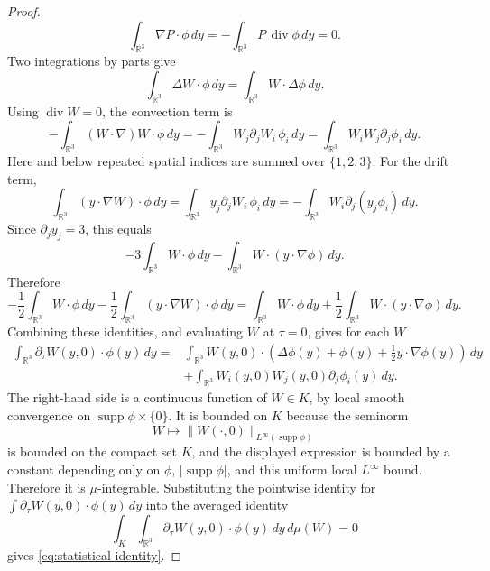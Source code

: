 \documentclass[11pt]{amsart}
\theoremstyle{plain}
\theoremstyle{definition}
\theoremstyle{remark}
\numberwithin{equation}{section}
\begin{document}
\begin{proof}
\[
   \int_{\mathbb R^3}\nabla P\cdot\phi\,dy
   =
   -\int_{\mathbb R^3}P\,\operatorname{div}\phi\,dy=0 .
\]
Two integrations by parts give
\[
   \int_{\mathbb R^3}\Delta W\cdot\phi\,dy
   =
   \int_{\mathbb R^3}W\cdot\Delta\phi\,dy .
\]
Using \(\operatorname{div}W=0\), the convection term is
\[
   -\int_{\mathbb R^3}(W\cdot\nabla)W\cdot\phi\,dy
   =
   -\int_{\mathbb R^3}W_j\partial_jW_i\,\phi_i\,dy
   =
   \int_{\mathbb R^3}W_iW_j\partial_j\phi_i\,dy .
\]
Here and below repeated spatial indices are summed over \(\{1,2,3\}\).
For the drift term,
\[
   \int_{\mathbb R^3}(y\cdot\nabla W)\cdot\phi\,dy
   =
   \int_{\mathbb R^3}y_j\partial_jW_i\,\phi_i\,dy
   =
   -\int_{\mathbb R^3}W_i\partial_j(y_j\phi_i)\,dy .
\]
Since \(\partial_jy_j=3\), this equals
\[
   -3\int_{\mathbb R^3}W\cdot\phi\,dy
   -
   \int_{\mathbb R^3}W\cdot(y\cdot\nabla\phi)\,dy .
\]
Therefore
\[
   -\frac12\int_{\mathbb R^3} W\cdot\phi\,dy
   -
   \frac12\int_{\mathbb R^3} (y\cdot\nabla W)\cdot\phi\,dy
   =
   \int_{\mathbb R^3} W\cdot\phi\,dy
   +
   \frac12\int_{\mathbb R^3} W\cdot(y\cdot\nabla\phi)\,dy .
\]
Combining these identities, and evaluating \(W\) at \(\tau=0\), gives for
each \(W\)
\[
   \begin{aligned}
   \int_{\mathbb R^3}\partial_\tau W(y,0)\cdot\phi(y)\,dy
   =
   &\int_{\mathbb R^3}
   W(y,0)\cdot
   \left(\Delta\phi(y)+\phi(y)+\frac12 y\cdot\nabla\phi(y)\right)\,dy\\
   &+
   \int_{\mathbb R^3}
   W_i(y,0)W_j(y,0)\partial_j\phi_i(y)\,dy .
   \end{aligned}
\]
The right-hand side is a continuous function of \(W\in K\), by local smooth
convergence on \(\operatorname{supp}\phi\times\{0\}\).  It is bounded on
\(K\) because the seminorm
\[
   W\mapsto \|W(\cdot,0)\|_{L^\infty(\operatorname{supp}\phi)}
\]
is bounded on the compact set \(K\), and the displayed expression is bounded
by a constant depending only on \(\phi\), \(|\operatorname{supp}\phi|\), and
this uniform local \(L^\infty\) bound.  Therefore it is \(\mu\)-integrable.
Substituting the pointwise identity for
\(\int \partial_\tau W(y,0)\cdot\phi(y)\,dy\) into the averaged identity
\[
   \int_K\int_{\mathbb R^3}\partial_\tau W(y,0)\cdot\phi(y)\,dy\,d\mu(W)=0
\]
gives \eqref{eq:statistical-identity}.
\end{proof}
\end{document}

